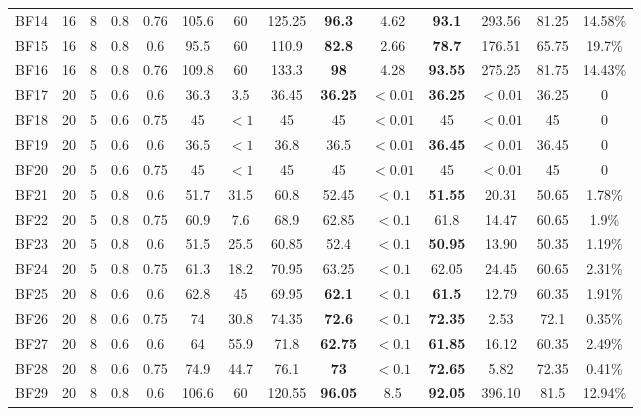 \documentclass[review,3p,times,authoryear,12pt]{elsarticle}
\begin{document}
\begin{table}[!htb]
\begin{tabular}{c|c|c|c|c|c|c|c|c|c|c|c|c|c}
    BF14  & 16 & 8  & 0.8 & 0.76 & 105.6 & 60    & 125.25 & \textbf{96.3} & 4.62    & \textbf{93.1}  & 293.56  & 81.25 & 14.58\%\\
    BF15  & 16 & 8  & 0.8 & 0.6  & 95.5  & 60    & 110.9  & \textbf{82.8} & 2.66    & \textbf{78.7}  & 176.51  & 65.75 & 19.7\%\\
    BF16  & 16 & 8  & 0.8 & 0.76 & 109.8 & 60    & 133.3  & \textbf{98}   & 4.28    & \textbf{93.55} & 275.25  & 81.75 & 14.43\%\\
    BF17  & 20 & 5  & 0.6 & 0.6  & 36.3  & 3.5   & 36.45  & \textbf{36.25}& $<0.01$ & \textbf{36.25} & $<0.01$ & 36.25 & 0\\
    BF18  & 20 & 5  & 0.6 & 0.75 & 45    & $<1$  & 45     & 45            & $<0.01$ & 45             & $<0.01$ & 45    & 0\\
    BF19  & 20 & 5  & 0.6 & 0.6  & 36.5  & $<1$  & 36.8   & 36.5          & $<0.01$ & \textbf{36.45} & $<0.01$ & 36.45 & 0\\
    BF20  & 20 & 5  & 0.6 & 0.75 & 45    & $<1$  & 45     & 45            & $<0.01$ & 45             & $<0.01$ & 45    & 0\\
    BF21  & 20 & 5  & 0.8 & 0.6  & 51.7  & 31.5  & 60.8   & 52.45         & $<0.1$  & \textbf{51.55} & 20.31   & 50.65 & 1.78\%\\
    BF22  & 20 & 5  & 0.8 & 0.75 & 60.9  & 7.6   & 68.9   & 62.85         & $<0.1$  & 61.8           & 14.47   & 60.65 & 1.9\%\\
    BF23  & 20 & 5  & 0.8 & 0.6  & 51.5  & 25.5  & 60.85  & 52.4          & $<0.1$  & \textbf{50.95} & 13.90   & 50.35 & 1.19\%\\
    BF24  & 20 & 5  & 0.8 & 0.75 & 61.3  & 18.2  & 70.95  & 63.25         & $<0.1$  & 62.05          & 24.45   & 60.65 & 2.31\%\\
    BF25  & 20 & 8  & 0.6 & 0.6  & 62.8  & 45    & 69.95  & \textbf{62.1} & $<0.1$  & \textbf{61.5}  & 12.79   & 60.35 & 1.91\%\\
    BF26  & 20 & 8  & 0.6 & 0.75 & 74    & 30.8  & 74.35  & \textbf{72.6} & $<0.1$  & \textbf{72.35} & 2.53    & 72.1  & 0.35\%\\
    BF27  & 20 & 8  & 0.6 & 0.6  & 64    & 55.9  & 71.8   & \textbf{62.75}& $<0.1$  & \textbf{61.85} & 16.12   & 60.35 & 2.49\%\\
    BF28& 20 & 8  & 0.6 & 0.75 & 74.9  & 44.7  & 76.1   & \textbf{73}   & $<0.1$  & \textbf{72.65} & 5.82    & 72.35 & 0.41\%\\
    BF29  & 20 & 8  & 0.8 & 0.6  & 106.6 & 60    & 120.55 & \textbf{96.05}& 8.5     & \textbf{92.05} & 396.10  & 81.5  & 12.94\%\\

\end{tabular}
\end{table}
\end{document}
